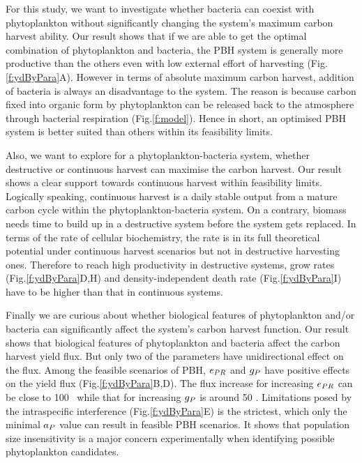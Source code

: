 \documentclass[../thesis.tex]{subfiles} %
\begin{document}
For this study, we want to investigate whether bacteria can coexist with phytoplankton without significantly changing the system’s maximum carbon harvest ability.  Our result shows that if we are able to get the optimal combination of phytoplankton and bacteria, the PBH system is generally more productive than the others even with low external effort of harvesting (Fig.\ref{f:ydByPara}A).  However in terms of absolute maximum carbon harvest, addition of bacteria is always an disadvantage to the system.  The reason is because carbon fixed into organic form by phytoplankton can be released back to the atmosphere through bacterial respiration (Fig.\ref{f:model}).  Hence in short, an optimised PBH system is better suited than others within its feasibility limits.

Also, we want to explore for a phytoplankton-bacteria system, whether destructive or continuous harvest can maximise the carbon harvest.  Our result shows a clear support towards continuous harvest within feasibility limits.  Logically speaking, continuous harvest is a daily stable output from a mature carbon cycle within the phytoplankton-bacteria system.  On a contrary, biomass needs time to build up in a destructive system before the system gets replaced.  In terms of the rate of cellular biochemistry, the rate is in its full theoretical potential under continuous harvest scenarios but not in destructive harvesting ones.  Therefore to reach high productivity in destructive systems, grow rates (Fig.\ref{f:ydByPara}D,H) and density-independent death rate (Fig.\ref{f:ydByPara}I) have to be higher than that in continuous systems.

Finally we are curious about whether biological features of phytoplankton and/or bacteria can significantly affect the system’s carbon harvest function.  Our result shows that biological features of phytoplankton and bacteria affect the carbon harvest yield flux.  But only two of the parameters have unidirectional effect on the flux.  Among the feasible scenarios of PBH, $e_{PR}$ and $g_P$ have positive effects on the yield flux (Fig.\ref{f:ydByPara}B,D).  The flux increase for increasing $e_{PR}$ can be close to 100 \dxdt\ while that for increasing $g_P$ is around 50 \dxdt.  Limitations posed by the intraspecific interference (Fig.\ref{f:ydByPara}E) is the strictest, which only the minimal $a_P$ value can result in feasible PBH scenarios.  It shows that population size insensitivity is a major concern experimentally when identifying possible phytoplankton candidates.
\end{document}
